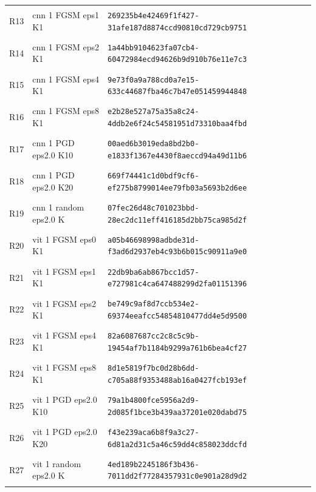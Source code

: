 \begin{longtable}{@{}l>{\raggedright\arraybackslash}p{3.5cm}p{10.8cm}@{}}
\hypertarget{R13}{R13} & cnn 1 FGSM eps1 K1 & {\fontsize{8.8}{11}\selectfont\texttt{269235b4e42469f1f427-31afe187d8874ccd90810cd729cb9751}} \\
\hypertarget{R14}{R14} & cnn 1 FGSM eps2 K1 & {\fontsize{8.8}{11}\selectfont\texttt{1a44bb9104623fa07cb4-60472984ecd94626b9d910b76e11e7c3}} \\
\hypertarget{R15}{R15} & cnn 1 FGSM eps4 K1 & {\fontsize{8.8}{11}\selectfont\texttt{9e73f0a9a788cd0a7e15-633c44687fba46c7b47e051459944848}} \\
\hypertarget{R16}{R16} & cnn 1 FGSM eps8 K1 & {\fontsize{8.8}{11}\selectfont\texttt{e2b28e527a75a35a8c24-4ddb2e6f24c54581951d73310baa4fbd}} \\
\hypertarget{R17}{R17} & cnn 1 PGD eps2.0 K10 & {\fontsize{8.8}{11}\selectfont\texttt{00aed6b3019eda8bd2b0-e1833f1367e4430f8aeccd94a49d11b6}} \\
\hypertarget{R18}{R18} & cnn 1 PGD eps2.0 K20 & {\fontsize{8.8}{11}\selectfont\texttt{669f74441c1d0bdf9cf6-ef275b8799014ee79fb03a5693b2d6ee}} \\
\hypertarget{R19}{R19} & cnn 1 random eps2.0 K & {\fontsize{8.8}{11}\selectfont\texttt{07fec26d48c701023bbd-28ec2dc11eff416185d2bb75ca985d2f}} \\
\hypertarget{R20}{R20} & vit 1 FGSM eps0 K1 & {\fontsize{8.8}{11}\selectfont\texttt{a05b46698998adbde31d-f3ad6d2937eb4c93b6b015c90911a9e0}} \\
\hypertarget{R21}{R21} & vit 1 FGSM eps1 K1 & {\fontsize{8.8}{11}\selectfont\texttt{22db9ba6ab867bcc1d57-e727981c4ca647488299d2fa01151396}} \\
\hypertarget{R22}{R22} & vit 1 FGSM eps2 K1 & {\fontsize{8.8}{11}\selectfont\texttt{be749c9af8d7ccb534e2-69374eeafcc54854810477dd4e5d9500}} \\
\hypertarget{R23}{R23} & vit 1 FGSM eps4 K1 & {\fontsize{8.8}{11}\selectfont\texttt{82a6087687cc2c8c5c9b-19454af7b1184b9299a761b6bea4cf27}} \\
\hypertarget{R24}{R24} & vit 1 FGSM eps8 K1 & {\fontsize{8.8}{11}\selectfont\texttt{8d1e5819f7bc0d28b6dd-c705a88f9353488ab16a0427fcb193ef}} \\
\hypertarget{R25}{R25} & vit 1 PGD eps2.0 K10 & {\fontsize{8.8}{11}\selectfont\texttt{79a1b4800fce5956a2d9-2d085f1bce3b439aa37201e020dabd75}} \\
\hypertarget{R26}{R26} & vit 1 PGD eps2.0 K20 & {\fontsize{8.8}{11}\selectfont\texttt{f43e239aca6b8f9a3c27-6d81a2d31c5a46c59dd4c858023ddcfd}} \\
\hypertarget{R27}{R27} & vit 1 random eps2.0 K & {\fontsize{8.8}{11}\selectfont\texttt{4ed189b2245186f3b436-7011dd2f77284357931c0e901a28d9d2}} \\

\end{longtable}
